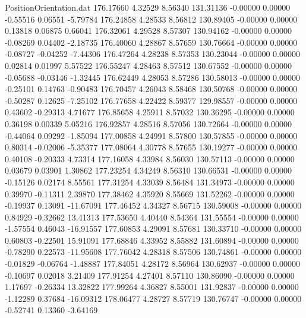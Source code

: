 \begin{filecontents}{PositionOrientation.dat}
 176.17660    4.32529    8.56340   131.31136   -0.00000    0.00000   -0.55516    0.06551   -5.79784
 176.24858    4.28533    8.56812   130.89405   -0.00000    0.00000    0.13818    0.06875    0.66041
 176.32061    4.29528    8.57307   130.94162   -0.00000    0.00000   -0.08269    0.04402   -2.18735
 176.40060    4.28867    8.57659   130.76664   -0.00000    0.00000   -0.08727   -0.04252   -7.44306
 176.47264    4.28238    8.57353   130.23044   -0.00000    0.00000    0.02814    0.01997    5.57522
 176.55247    4.28463    8.57512   130.67552   -0.00000    0.00000   -0.05688   -0.03146   -1.32445
 176.62449    4.28053    8.57286   130.58013   -0.00000    0.00000   -0.25101    0.14763   -0.90483
 176.70457    4.26043    8.58468   130.50768   -0.00000    0.00000   -0.50287    0.12625   -7.25102
 176.77658    4.22422    8.59377   129.98557   -0.00000    0.00000    0.43602   -0.29313    4.71677
 176.85658    4.25911    8.57032   130.36295   -0.00000    0.00000    0.36198    0.00339    5.05216
 176.92857    4.28516    8.57056   130.72664   -0.00000    0.00000   -0.44064    0.09292   -1.85094
 177.00858    4.24991    8.57800   130.57855   -0.00000    0.00000    0.80314   -0.02006   -5.35377
 177.08064    4.30778    8.57655   130.19277   -0.00000    0.00000    0.40108   -0.20333    4.73314
 177.16058    4.33984    8.56030   130.57113   -0.00000    0.00000    0.03679    0.03901    1.30862
 177.23254    4.34249    8.56310   130.66531   -0.00000    0.00000   -0.15126    0.02174    8.55561
 177.31254    4.33039    8.56484   131.34973   -0.00000    0.00000    0.39970   -0.11311    2.39870
 177.38462    4.35920    8.55669   131.52262   -0.00000    0.00000   -0.19937    0.13091  -11.67091
 177.46452    4.34327    8.56715   130.59008   -0.00000    0.00000    0.84929   -0.32662   13.41313
 177.53650    4.40440    8.54364   131.55554   -0.00000    0.00000   -1.57554    0.46043  -16.91557
 177.60853    4.29091    8.57681   130.33710   -0.00000    0.00000    0.60803   -0.22501   15.91091
 177.68846    4.33952    8.55882   131.60894   -0.00000    0.00000   -0.78290    0.22573  -11.95608
 177.76042    4.28318    8.57506   130.74861   -0.00000    0.00000   -0.01829   -0.06764   -1.48887
 177.84051    4.28172    8.56964   130.62937   -0.00000    0.00000   -0.10697    0.02018    3.21409
 177.91254    4.27401    8.57110   130.86090   -0.00000    0.00000    1.17697   -0.26334   13.32822
 177.99264    4.36827    8.55001   131.92837   -0.00000    0.00000   -1.12289    0.37684  -16.09312
 178.06477    4.28727    8.57719   130.76747   -0.00000    0.00000   -0.52741    0.13360   -3.64169

\end{filecontents}
